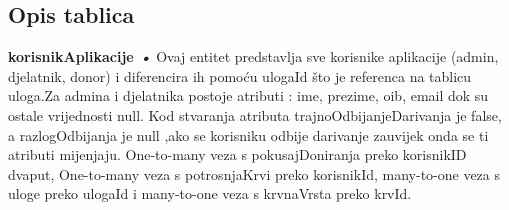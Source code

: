 		\eject
			\subsection{Opis tablica}
			

				\textbf{korisnikAplikacije \textit{•}}
				 Ovaj entitet predstavlja sve korisnike aplikacije (admin, djelatnik, donor) i diferencira ih pomoću ulogaId što je referenca na tablicu uloga.Za admina i djelatnika postoje atributi : ime, prezime, oib, email dok su ostale vrijednosti null. Kod stvaranja atributa trajnoOdbijanjeDarivanja je false, a razlogOdbijanja je null ,ako se korisniku odbije darivanje zauvijek onda se ti atributi mijenjaju. One-to-many veza s pokusajDoniranja preko korisnikID dvaput, One-to-many veza s potrosnjaKrvi preko korisnikId, many-to-one veza s uloge preko ulogaId i many-to-one veza s krvnaVrsta preko krvId.

